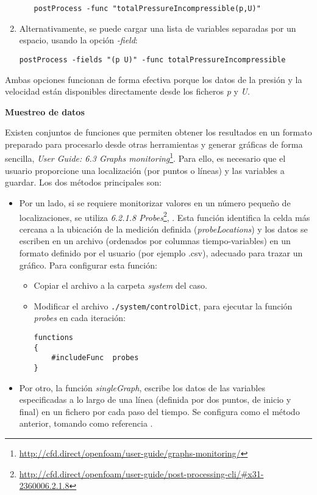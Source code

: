 \begin{enumerate}
\begin{itemize}
    \begin{lstlisting}[style=bash]
      postProcess -func "totalPressureIncompressible(p,U)"
    \end{lstlisting}

  \end{itemize}
\item
  Alternativamente, se puede cargar una lista de variables separadas por
  un espacio, usando la opción \emph{-field}:

  \begin{lstlisting}[style=bash]
    postProcess -fields "(p U)" -func totalPressureIncompressible
  \end{lstlisting}
\end{enumerate}

Ambas opciones funcionan de forma efectiva porque los datos de la
presión y la velocidad están disponibles directamente desde los ficheros
\emph{p} y \emph{U}.

\textbf{Muestreo de datos}

Existen conjuntos de funciones que permiten obtener los resultados en un
formato preparado para procesarlo desde otras herramientas y generar
gráficas de forma sencilla, \emph{User
Guide: 6.3 Graphs monitoring}\footnote{\url{http://cfd.direct/openfoam/user-guide/graphs-monitoring/}}. Para ello, es necesario que el usuario
proporcione una localización (por puntos o líneas) y las variables a
guardar. Los dos métodos principales son:

\begin{itemize}
\item
  Por un lado, si se requiere monitorizar valores en un número pequeño
  de localizaciones, se utiliza \emph{6.2.1.8 Probes}\footnote{\url{http://cfd.direct/openfoam/user-guide/post-processing-cli/\#x31-2360006.2.1.8}},
  . Esta función identifica la celda más cercana a la ubicación
  de la medición definida (\emph{probeLocations}) y los datos se
  escriben en un archivo (ordenados por columnas tiempo-variables) en un
  formato definido por el usuario (por ejemplo .csv), adecuado para
  trazar un gráfico. Para configurar esta función:

  \begin{itemize}
  \item
    Copiar el archivo a la carpeta \emph{system} del caso.
  \item
    Modificar el archivo \lstinline[style=bash]{./system/controlDict},
    para ejecutar la función \emph{probes} en cada iteración:

\begin{lstlisting}[style=c++]
functions
{
    #includeFunc  probes
}
\end{lstlisting}

  \end{itemize}
\item
  Por otro, la función \emph{singleGraph}, escribe los datos de las
  variables especificadas a lo largo de una línea (definida por dos
  puntos, de inicio y final) en un fichero por cada paso del tiempo. Se
  configura como el método anterior, tomando como referencia .
\end{itemize}

